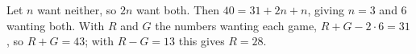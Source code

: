 Let $n$ want neither, so $2n$ want both. Then $40=31+2n+n$, giving $n=3$ and $6$ wanting both. With $R$ and $G$ the numbers wanting each game, $R+G-2\cdot6=31$, so $R+G=43$; with $R-G=13$ this gives $R=\boxed{28}$.
